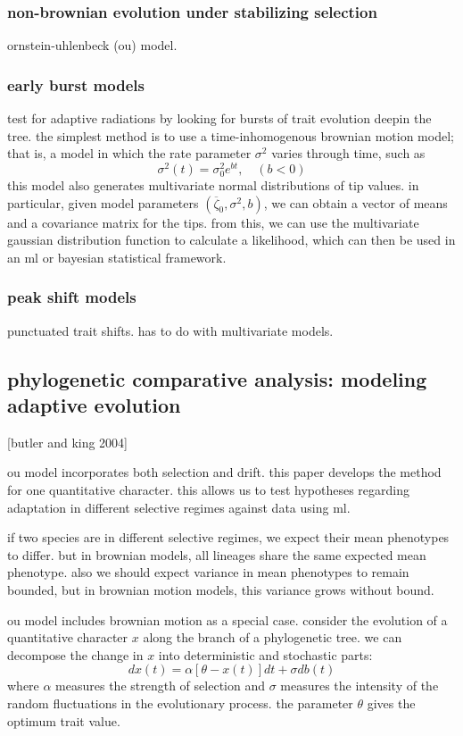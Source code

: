 \documentclass{article}
\begin{document}
\subsubsection{non-brownian evolution under stabilizing selection}
ornstein-uhlenbeck (ou) model.

\subsubsection{early burst models}
test for adaptive radiations by looking for bursts of trait evolution deepin the
tree. the simplest method is to use a time-inhomogenous brownian motion model;
that is, a model in which the rate parameter $\sigma^{2}$ varies through time, such as
\begin{equation*}
  \sigma^{2}(t) = \sigma_0^{2}e^{bt}, \quad(b<0)
\end{equation*}
this model also generates multivariate normal distributions of tip values. in
particular, given model parameters $(\overline{\zeta}_0,\sigma^{2},b)$, we can
obtain a vector of means and a covariance matrix for the tips. from this, we can
use the multivariate gaussian distribution function to calculate a likelihood,
which can then be used in an ml or bayesian statistical framework.

\subsubsection{peak shift models}
punctuated trait shifts. has to do with multivariate models.


\subsection{phylogenetic comparative analysis: modeling adaptive evolution}
[butler and king 2004]

ou model incorporates both selection and drift. this paper develops the method for one quantitative character. this allows us to test hypotheses regarding adaptation in different selective regimes against data using ml. 

if two species are in different selective regimes, we expect their mean phenotypes to differ. but in brownian models, all lineages share the same expected mean phenotype. also we should expect variance in mean phenotypes to remain bounded, but in brownian motion models, this variance grows without bound.

ou model includes brownian motion as a special case. consider the evolution of a quantitative character $x$ along the branch of a phylogenetic tree. we can decompose the change in $x$ into deterministic and stochastic parts:
\begin{equation*}
  dx(t) = \alpha \left[ \theta -x(t) \right]dt + \sigma db(t)
\end{equation*}
where $\alpha$ measures the strength of selection and $\sigma$ measures the intensity of the random fluctuations in the evolutionary process. the parameter $\theta$ gives the optimum trait value.
\end{document}
